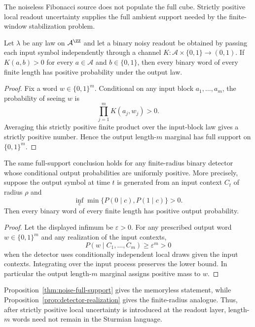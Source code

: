 The noiseless Fibonacci source does not populate the full cube. Strictly positive local readout uncertainty supplies the full ambient support needed by the finite-window stabilization problem.

\begin{proposition}\label{thm:noise-full-support}
Let $\lambda$ be any law on $\mathcal A^{\ZZ}$ and let a binary noisy readout
be obtained by passing each input symbol independently through a channel
$K:\mathcal A\times\{0,1\}\to(0,1)$.  If
$K(a,b)>0$ for every $a\in\mathcal A$ and $b\in\{0,1\}$, then every binary
word of every finite length has positive probability under the output law.
\end{proposition}

\begin{proof}
Fix a word $w\in\{0,1\}^m$.  Conditional on any input block
$a_1,\ldots,a_m$, the probability of seeing $w$ is
\[
  \prod_{j=1}^m K(a_j,w_j)>0.
\]
Averaging this strictly positive finite product over the input-block law gives
a strictly positive number.  Hence the output length-$m$ marginal has full
support on $\{0,1\}^m$.
\end{proof}

\begin{proposition}\label{prop:detector-realization}
The same full-support conclusion holds for any finite-radius binary detector
whose conditional output probabilities are uniformly positive.  More
precisely, suppose the output symbol at time $t$ is generated from an input
context $C_t$ of radius $\rho$ and
\[
  \inf_{c}\min\{P(0\mid c),P(1\mid c)\}>0 .
\]
Then every binary word of every finite length has positive output probability.
\end{proposition}

\begin{proof}
Let the displayed infimum be $\varepsilon>0$.  For any prescribed output word
$w\in\{0,1\}^m$ and any realization of the input contexts,
\[
P(w\mid C_1,\ldots,C_m)\ge \varepsilon^m>0
\]
when the detector uses conditionally independent local draws given the input
contexts.  Integrating over the input process preserves the lower bound.  In
particular the output length-$m$ marginal assigns positive mass to $w$.
\end{proof}
\begin{remark}
Proposition~\ref{thm:noise-full-support} gives the memoryless statement, while Proposition~\ref{prop:detector-realization} gives the finite-radius analogue. Thus, after strictly positive local uncertainty is introduced at the readout layer, length-$m$ words need not remain in the Sturmian language.
\end{remark}

